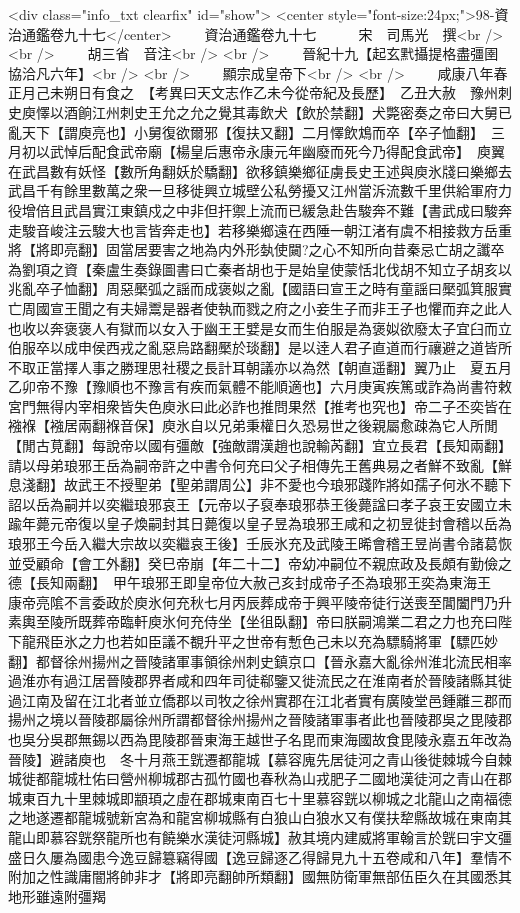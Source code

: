 <div class="info_txt clearfix" id="show">
<center style="font-size:24px;">98-資治通鑑卷九十七</center>
  　　資治通鑑卷九十七　　　宋　司馬光　撰<br />
<br />
　　胡三省　音注<br />
<br />
　　晉紀十九【起玄黓攝提格盡彊圉協洽凡六年】<br />
<br />
　　顯宗成皇帝下<br />
<br />
　　咸康八年春正月己未朔日有食之　【考異曰天文志作乙未今從帝紀及長歷】　乙丑大赦　豫州刺史庾懌以酒餉江州刺史王允之允之覺其毒飲犬【飲於禁翻】犬斃密奏之帝曰大舅已亂天下【謂庾亮也】小舅復欲爾邪【復扶又翻】二月懌飲鴆而卒【卒子恤翻】　三月初以武悼后配食武帝廟【楊皇后惠帝永康元年幽廢而死今乃得配食武帝】　庾翼在武昌數有妖怪【數所角翻妖於驕翻】欲移鎮樂鄉征虜長史王述與庾氷牋曰樂鄉去武昌千有餘里數萬之衆一旦移徙興立城壁公私勞擾又江州當泝流數千里供給軍府力役增倍且武昌實江東鎮戍之中非但扞禦上流而已緩急赴告駿奔不難【書武成曰駿奔走駿音峻注云駿大也言皆奔走也】若移樂鄉遠在西陲一朝江渚有虞不相接救方岳重將【將即亮翻】固當居要害之地為内外形埶使闚?之心不知所向昔秦忌亡胡之讖卒為劉項之資【秦盧生奏錄圖書曰亡秦者胡也于是始皇使蒙恬北伐胡不知立子胡亥以兆亂卒子恤翻】周惡檿弧之謡而成褒姒之亂【國語曰宣王之時有童謡曰檿弧箕服實亡周國宣王聞之有夫婦鬻是器者使執而戮之府之小妾生子而非王子也懼而弃之此人也收以奔褒褒人有獄而以女入于幽王王嬖是女而生伯服是為褒姒欲廢太子宜臼而立伯服卒以成申侯西戎之亂惡烏路翻檿於琰翻】是以逹人君子直道而行禳避之道皆所不取正當擇人事之勝理思社稷之長計耳朝議亦以為然【朝直遥翻】翼乃止　夏五月乙卯帝不豫【豫順也不豫言有疾而氣體不能順適也】六月庚寅疾篤或詐為尚書符敕宮門無得内宰相衆皆失色庾氷曰此必詐也推問果然【推考也究也】帝二子丕奕皆在襁褓【襁居兩翻褓音保】庾氷自以兄弟秉權日久恐易世之後親屬愈疎為它人所閒【閒古莧翻】每說帝以國有彊敵【強敵謂漢趙也說輸芮翻】宜立長君【長知兩翻】請以母弟琅邪王岳為嗣帝許之中書令何充曰父子相傳先王舊典易之者鮮不致亂【鮮息淺翻】故武王不授聖弟【聖弟謂周公】非不愛也今琅邪踐阼將如孺子何氷不聽下詔以岳為嗣并以奕繼琅邪哀王【元帝以子裒奉琅邪恭王後薨諡曰孝子哀王安國立未踰年薨元帝復以皇子煥嗣封其日薨復以皇子昱為琅邪王咸和之初昱徙封會稽以岳為琅邪王今岳入繼大宗故以奕繼哀王後】壬辰氷充及武陵王晞會稽王昱尚書令諸葛恢並受顧命【會工外翻】癸巳帝崩【年二十二】帝幼冲嗣位不親庶政及長頗有勤儉之德【長知兩翻】　甲午琅邪王即皇帝位大赦己亥封成帝子丕為琅邪王奕為東海王　康帝亮隂不言委政於庾氷何充秋七月丙辰葬成帝于興平陵帝徒行送喪至閶闔門乃升素輿至陵所既葬帝臨軒庾氷何充侍坐【坐徂臥翻】帝曰朕嗣鴻業二君之力也充曰陛下龍飛臣氷之力也若如臣議不覩升平之世帝有慙色己未以充為驃騎將軍【驃匹妙翻】都督徐州揚州之晉陵諸軍事領徐州刺史鎮京口【晉永嘉大亂徐州淮北流民相率過淮亦有過江居晉陵郡界者咸和四年司徒郗鑒又徙流民之在淮南者於晉陵諸縣其徙過江南及留在江北者並立僑郡以司牧之徐州實郡在江北者實有廣陵堂邑鍾離三郡而揚州之境以晉陵郡屬徐州所謂都督徐州揚州之晉陵諸軍事者此也晉陵郡吳之毘陵郡也吳分吳郡無錫以西為毘陵郡晉東海王越世子名毘而東海國故食毘陵永嘉五年改為晉陵】避諸庾也　冬十月燕王皝遷都龍城【慕容廆先居徒河之青山後徙棘城今自棘城徙都龍城杜佑曰營州柳城郡古孤竹國也春秋為山戎肥子二國地漢徒河之青山在郡城東百九十里棘城即顓頊之虛在郡城東南百七十里慕容皝以柳城之北龍山之南福德之地遂遷都龍城號新宮為和龍宮柳城縣有白狼山白狼水又有僕扶犂縣故城在東南其龍山即慕容皝祭龍所也有饒樂水漢徒河縣城】赦其境内建威將軍翰言於皝曰宇文彊盛日久屢為國患今逸豆歸簒竊得國【逸豆歸逐乙得歸見九十五卷咸和八年】羣情不附加之性識庸闇將帥非才【將即亮翻帥所類翻】國無防衛軍無部伍臣久在其國悉其地形雖遠附彊羯